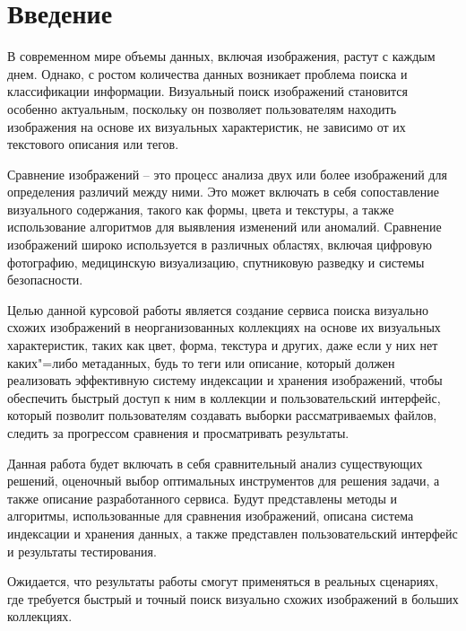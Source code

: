 \documentclass[variant=courcework]{bsuir}
\begin{document}
\maketitle



\tableofcontents

\chapter*{Введение}

В современном мире объемы данных, включая изображения, растут с каждым днем.
Однако, с ростом количества данных возникает проблема поиска и классификации
информации. Визуальный поиск изображений становится особенно актуальным,
поскольку он позволяет пользователям находить изображения на основе их
визуальных характеристик, не зависимо от их текстового описания или тегов.

Сравнение изображений -- это процесс анализа двух или более изображений для
определения различий между ними. Это может включать в себя сопоставление
визуального содержания, такого как формы, цвета и текстуры, а также
использование алгоритмов для выявления изменений или аномалий. Сравнение
изображений широко используется в различных областях, включая цифровую
фотографию, медицинскую визуализацию, спутниковую разведку и системы
безопасности.

Целью данной курсовой работы является создание сервиса поиска визуально схожих
изображений в неорганизованных коллекциях на основе их визуальных характеристик,
таких как цвет, форма, текстура и других, даже если у них нет каких"=либо
метаданных, будь то теги или описание, который должен реализовать эффективную
систему индексации и хранения изображений, чтобы обеспечить быстрый доступ к ним
в коллекции и пользовательский интерфейс, который позволит пользователям
создавать выборки рассматриваемых файлов, следить за прогрессом сравнения и
просматривать результаты.

Данная работа будет включать в себя сравнительный анализ существующих решений,
оценочный выбор оптимальных инструментов для решения задачи, а также описание
разработанного сервиса. Будут представлены методы и алгоритмы, использованные
для сравнения изображений, описана система индексации и хранения данных, а также
представлен пользовательский интерфейс и результаты тестирования.

Ожидается, что результаты работы смогут применяться в реальных сценариях, где
требуется быстрый и точный поиск визуально схожих изображений в больших
коллекциях.
\end{document}
